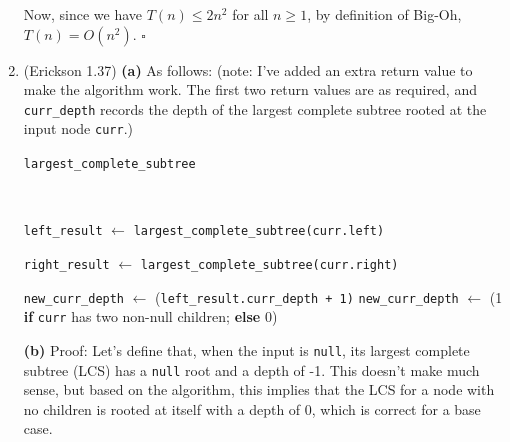\documentclass{article}
\begin{document}
\begin{enumerate}
    Now, since we have $T(n) \le 2n^2$ for all $n \ge 1$, by definition of Big-Oh, $T(n) = O(n^2)$. $\square$

    \pagebreak

  \item (Erickson 1.37) \textbf{(a)} As follows: (note: I've added an extra return value to make the algorithm work. The first two return values are as required, and \texttt{curr\_depth} records the depth of the largest complete subtree rooted at the input node \texttt{curr}.)
    \begin{center}
      \begin{minipage}{0.9375\linewidth}
        \renewcommand{\thealgocf}{}
        \begin{algorithm}[H]
          \caption{\tt largest\_complete\_subtree}

          \texttt{\\}

          {
          }

          \texttt{left\_result} $\gets$ \texttt{largest\_complete\_subtree(curr.left)}

          \texttt{right\_result} $\gets$ \texttt{largest\_complete\_subtree(curr.right)}

          {
            \texttt{new\_curr\_depth} $\gets$ (\texttt{left\_result.curr\_depth + 1)}
          }
          \Else
          {
            \texttt{new\_curr\_depth} $\gets$ (1 \textbf{if} \texttt{curr} has two non-null children; \textbf{else} 0)
          }

          {
          }
          {
          }

        \end{algorithm}
      \end{minipage}
    \end{center}

    \textbf{(b)} Proof: Let's define that, when the input is \texttt{null}, its largest complete subtree (LCS) has a \texttt{null} root and a depth of -1. This doesn't make much sense, but based on the algorithm, this implies that the LCS for a node with no children is rooted at itself with a depth of 0, which is correct for a base case.


\end{enumerate}
\end{document}
